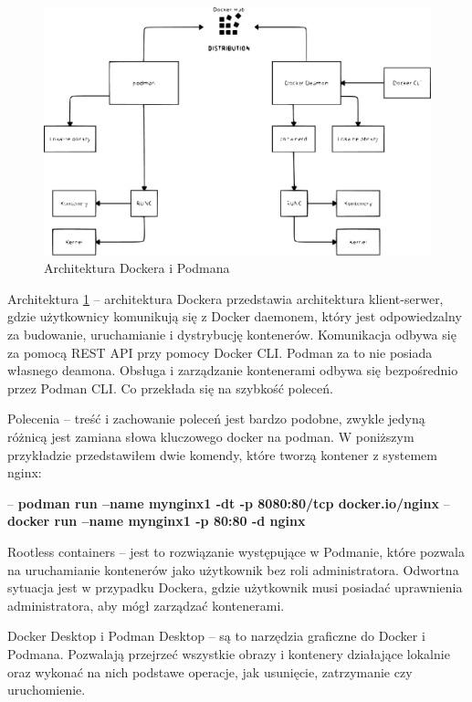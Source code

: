 \documentclass{iiuwb}
\begin{document}
\begin{figure}[!h]
\centering
\includegraphics[width=12cm]{ArchitekturaDockeriPodman.pdf}
\caption{Architektura Dockera i Podmana}
\label{fig: Architektura Dockera i Podmana}
\end{figure}

Architektura \ref{fig: Architektura Dockera i Podmana} -- architektura Dockera przedstawia architektura klient-serwer, gdzie użytkownicy komunikują się z Docker daemonem, który jest odpowiedzalny za budowanie, uruchamianie i dystrybucję kontenerów. Komunikacja odbywa się za pomocą REST API przy pomocy Docker CLI. Podman za to nie posiada własnego deamona. Obsługa i zarządzanie kontenerami odbywa się bezpośrednio przez Podman CLI. Co przekłada się na szybkość poleceń.\newline

Polecenia -- treść i zachowanie poleceń jest bardzo podobne, zwykle jedyną różnicą jest zamiana słowa kluczowego docker na podman. W poniższym przykładzie przedstawiłem dwie komendy, które tworzą kontener z systemem nginx: 

\noindent -- \textbf{podman run --name mynginx1 -dt -p 8080:80/tcp docker.io/nginx} \newline
-- \textbf{docker run --name mynginx1 -p 80:80 -d nginx}
\newline

Rootless containers -- jest to rozwiązanie występujące w Podmanie, które pozwala na uruchamianie kontenerów jako użytkownik bez roli administratora. Odwortna sytuacja jest w przypadku Dockera, gdzie użytkownik musi posiadać uprawnienia administratora, aby mógł zarządzać kontenerami.
\newline

Docker Desktop i Podman Desktop -- są to narzędzia graficzne do Docker i Podmana. Pozwalają przejrzeć wszystkie obrazy i kontenery działające lokalnie oraz wykonać na nich podstawe operacje, jak usunięcie, zatrzymanie czy uruchomienie.
\newline
\end{document}
